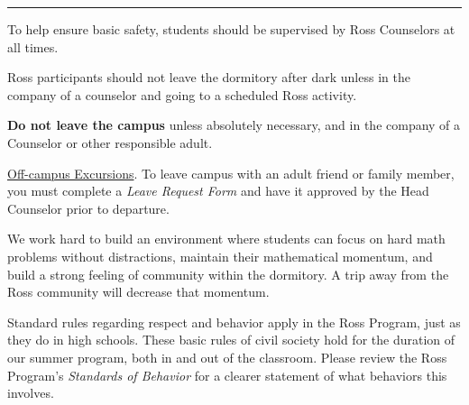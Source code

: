 \documentclass{ross}
\begin{document}
\bigskip\hrule
\pagebreak

To help ensure basic safety, students should be supervised 
by Ross Counselors at all times.

Ross participants should not leave the dormitory after dark unless 
in the company of a counselor and going to a scheduled Ross activity.

\textbf{Do not leave the campus} unless absolutely necessary, and in
the company of a Counselor or other responsible adult.

\underline{Off-campus Excursions}.  To leave campus with
an adult friend or family member, you must complete a {\it Leave Request Form} 
and have it approved by the Head Counselor prior to departure.

We work hard to build an environment where students can focus on hard math problems
without distractions, maintain their mathematical momentum,
 and build a strong feeling of community within the dormitory.  
 A trip away from the Ross community will decrease that momentum.

Standard rules regarding respect and behavior apply in the Ross
Program, just as they do in high schools. These basic rules of civil society hold 
for the duration of our summer program, both in and out of the classroom. 
Please review the Ross Program's \textit{Standards of Behavior} for
a clearer statement of what behaviors this involves.
\end{document}
